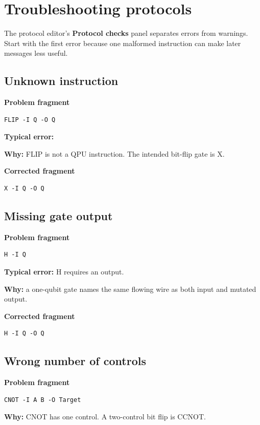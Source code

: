 \section{Troubleshooting protocols}

The protocol editor's \textbf{Protocol checks} panel separates errors from
warnings. Start with the first error because one malformed instruction can
make later messages less useful.

\subsection{Unknown instruction}

\textbf{Problem fragment}
\begin{lstlisting}
FLIP -I Q -O Q
\end{lstlisting}

\textbf{Typical error:} 

\textbf{Why:} FLIP is not a QPU instruction. The intended bit-flip gate is X.

\textbf{Corrected fragment}
\begin{lstlisting}
X -I Q -O Q
\end{lstlisting}

\subsection{Missing gate output}

\textbf{Problem fragment}
\begin{lstlisting}
H -I Q
\end{lstlisting}

\textbf{Typical error:} H requires an  output.

\textbf{Why:} a one-qubit gate names the same flowing wire as both input and
mutated output.

\textbf{Corrected fragment}
\begin{lstlisting}
H -I Q -O Q
\end{lstlisting}

\subsection{Wrong number of controls}

\textbf{Problem fragment}
\begin{lstlisting}
CNOT -I A B -O Target
\end{lstlisting}

\textbf{Why:} CNOT has one control. A two-control bit flip is CCNOT.

